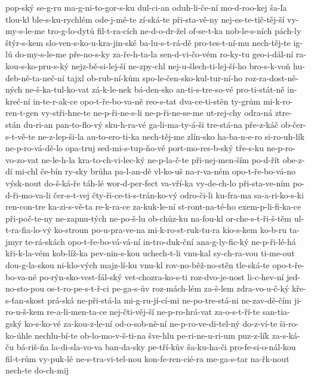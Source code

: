 pop-ský
se-g-ru
ma-g-ni-to-gor-s-ku
dul-ci-an
oduh-li-če-ní
mo-d-roo-kej
ša-ľa
tlou-kl
ble-s-ku-rychlém
ode-j-mě-te
zí-ská-te
při-sta-vě-ny
nej-es-te-tič-těj-ší
vy-my-s-le-me
tro-g-lo-dytů
fil-t-ra-cích
ne-d-o-dr-žel
of-se-t-ka
nob-le-s-ních
pách-ly
štýr-s-kem
slo-ven-s-ko-u-kra-jin-ské
ba-lu-s-t-rá-dě
pro-tes-t-ní-mu
nech-těj-te
ig-lú
do-my-s-le-me
pře-no-s-ky
za-ře-h-ta-la
sen-d-vi-čo-vém
ro-ky-tu
geo-i-dál-ní
ra-kou-s-ko-pru-s-ký
nejz-bě-si-lej-ší
ne-zpy-chl
nej-u-šlech-ti-lej-ší-ho
bro-s-k-voň
hu-deb-ně-ta-neč-ní
tajxl
ob-rub-ní-kům
spo-le-čen-sko-kul-tur-ní-ho
roz-ra-dost-ně-ných
ne-š-ka-tul-ko-vat
zá-k-le-nek
bá-den-sko
an-ti-s-tre-so-vé
pro-ti-stát-ně
in-kreč-ní
in-te-r-ak-ce
opo-t-ře-bo-va-ně
reo-s-tat
dva-ce-ti-stěn
ty-grům
mi-k-ro-ren-t-gen
vy-stři-hne-te
ne-p-ři-ne-s-li
ne-p-ři-ne-se-me
ut-rej-chy
odra-ná
ztre-stán
du-ri-an
pan-to-flo-vý
sku-h-ra-vé
ga-li-ma-ty-á-ši
tre-stá-na
pře-z-káč
ob-čer-s-t-vě-te
ne-z-lep-ši-la
au-to-ero-ti-ka
nech-těj-me
zlín-sko
ha-ba-n-e-ro
si-ro-uh-lík
ne-p-ro-vá-dě-lo
opa-truj
sed-mi-s-tup-ňo-vé
port-mo-res-b-ský
tře-s-ku
ne-p-ro-vo-zo-vat
ne-le-h-la
kra-to-ch-vi-lec-ký
ne-p-la-č-te
při-nej-men-ším
po-d-řít
obe-z-dí
mi-chl
če-bín
ry-sky
brůha
pa-l-an-dě
vl-ko-uš
na-r-va-ném
opo-t-ře-bo-vá-no
výsk-nout
do-š-ká-ře
táh-lé
wor-d-per-fect
va-vří-ka
vy-de-ch-lo
při-sta-ve-ním
po-d-ři-mo-va-li
čer-s-t-vej
čty-ři-ce-ti-s-trán-ko-vý
odro-či-li
ku-fra-ma
sa-a-ri-ko-s-ki
ren-con-tre
ka-zi-s-vě-ta
re-k-ra-ce
za-kuk-le-ní
st-ront-na-té-ho
exem-p-li-fi-ka-ce
při-poč-te-ny
ne-zapnu-tých
ne-po-š-lu
ob-chůz-ku
na-fou-kl
or-che-s-t-ři-š-těm
ul-t-ra-fia-lo-vý
ko-stroun
po-u-pra-ve-na
mi-k-ro-st-ruk-tu-ra
kio-s-kem
ko-b-ru
ta-jmyr
te-rá-skách
opo-t-ře-bo-vá-vá-ní
in-tro-duk-ční
ana-g-ly-fic-ký
ne-p-ři-lé-há
kři-k-la-vém
kob-líž-ka
pev-nin-s-kou
uchech-t-li
vnu-kal
sy-ch-ra-vou
ti-me-out
dou-g-la-skou
ni-klo-vých
majz-lí-ku
vnu-kl
rov-no-běž-no-stěn
tle-ská-te
opo-t-ře-bo-va-né
po-rýn-sko-vest-fál-ský
vet-chozra-ko-s-ti
roz-dvo-je-nost
li-c-hev-ní
jed-no-sto-pou
os-t-ro-pe-s-t-ř-ci
pe-ga-s-ův
roz-mách-lém
za-š-lem
zdra-vo-u-č-ký
kře-s-ťan-skost
prá-ská
ne-při-stá-la
mi-g-ru-jí-cí-mi
ne-po-tre-stá-ni
ne-zav-dě-čím
ji-ro-u-š-kem
re-a-li-men-ta-ce
nej-čti-věj-ší
ne-p-ro-hrá-vat
za-o-s-t-ří-te
san-tia-gský
ko-s-ko-vé
za-kou-z-le-ní
od-o-sob-ně-ní
ne-p-ro-ve-di-tel-ný
do-z-ví-te
ši-ro-ko-úhle
nechlu-bí-te
ob-lo-mo-v-š-ti-na
šve-hlu
pe-ri-ne-u-ri-um
puz-z-lík
za-s-ká-ču
bá-riš-ňa
la-di-sla-vo-va
ban-da-sky
pe-tří-kův
ša-ku-ha-či
pro-fe-si-o-nál-kou
fil-t-rům
vy-puk-lé
ne-s-tra-vi-tel-nou
kon-fe-ren-cié-ra
me-ga-s-tar
na-řk-nout
nech-te
do-ch-mij
